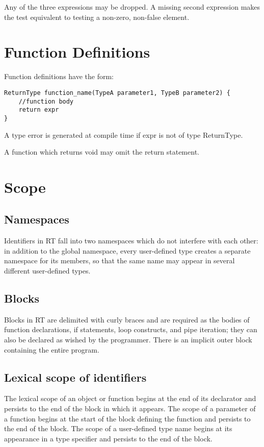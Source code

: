 Any of the three expressions may be dropped.  A missing second expression makes the test
equivalent to testing a non-zero, non-false element.

\section{Function Definitions}
Function definitions have the form:
\begin{verbatim}
ReturnType function_name(TypeA parameter1, TypeB parameter2) {
    //function body
    return expr
}
\end{verbatim}
A type error is generated at compile time if expr is not of type ReturnType.

A function which returns void may omit the return statement.
\section{Scope}

\subsection{Namespaces}
Identifiers in RT fall into two namespaces which do not interfere with each 
other: in addition to the global namespace, every user-defined type creates a 
separate namespace for its members, so that the same name may appear in 
several different user-defined types.

\subsection{Blocks}
Blocks in RT are delimited with curly braces and are required as the bodies of 
function declarations, if statements, loop constructs, and pipe iteration; they can 
also be declared as wished by the programmer.  There is an implicit outer block 
containing the entire program.

\subsection{Lexical scope of identifiers}
The lexical scope of an object or function begins at the end of its declarator 
and persists to the end of the block in which it appears. The scope of a 
parameter of a function begins at the start of the block defining the function 
and persists to the end of the block.  The scope of a user-defined type name 
begins at its appearance in a type specifier and persists to the end of the block.

